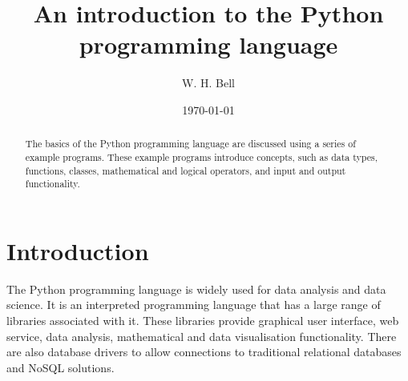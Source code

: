 \documentclass[11pt,a4paper]{article}
\begin{document}
\title{An introduction to the Python programming language}
\author{W. H. Bell}
\date{
\today
}

\maketitle

\begin{abstract}

The basics of the Python programming language are discussed using a series of example programs.  These example programs introduce concepts, such as data types, functions, classes, mathematical and logical operators, and input and output functionality.
\end{abstract}


\clearpage
\newpage

{\parskip=0pt
\tableofcontents
}

\clearpage
\newpage

\pagestyle{fancy}

\lstset{language = Python}
\lstset{xleftmargin = 2em}
\lstset{framexleftmargin = 2em}
\section{Introduction}

The Python programming language is widely used for data analysis and data science.  It is an interpreted programming language that has a large range of libraries associated with it.  These libraries provide graphical user interface, web service, data analysis, mathematical and data visualisation functionality.  There are also database drivers to allow connections to traditional relational databases and NoSQL solutions.
\end{document}
